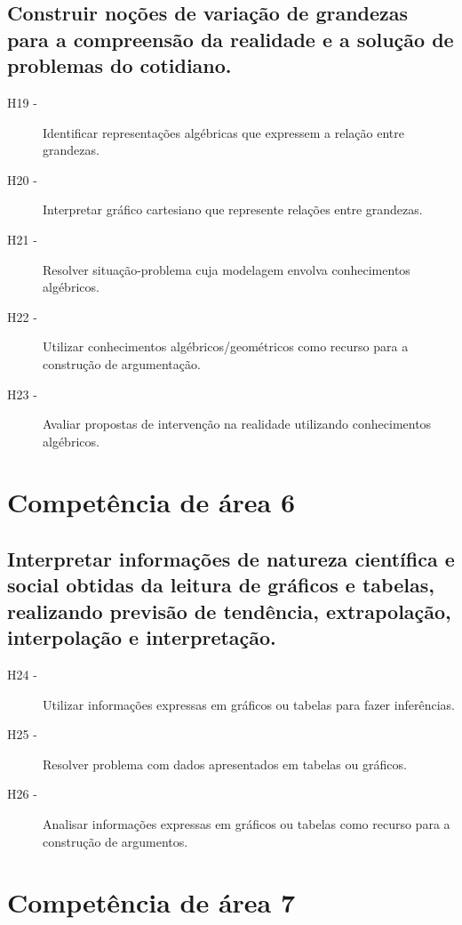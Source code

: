     \subsection*{Construir noções de variação de grandezas para a compreensão da realidade
    	e a solução de problemas do cotidiano.}
    	\begin{description}
    		\item [H19 -]Identificar representações algébricas que expressem a relação entre grandezas.
    		\item [H20 -]Interpretar gráfico cartesiano que represente relações entre grandezas.
    		\item [H21 -]Resolver situação-problema cuja modelagem envolva conhecimentos algébricos.
    		\item [H22 -]Utilizar conhecimentos algébricos/geométricos como recurso para a construção de argumentação.
    		\item [H23 -]Avaliar propostas de intervenção na realidade utilizando conhecimentos algébricos.
    	\end{description}

\section*{Competência de área 6}
    \subsection*{Interpretar informações de natureza científica e social obtidas da leitura de gráficos e tabelas,
    	realizando previsão de tendência, extrapolação, interpolação e interpretação.}
    	\begin{description}
    		\item [H24 -]Utilizar informações expressas em gráficos ou tabelas para fazer inferências.
    		\item [H25 -]Resolver problema com dados apresentados em tabelas ou gráficos.
    		\item [H26 -]Analisar informações expressas em gráficos ou tabelas como recurso para a construção de argumentos.
    	\end{description}

\section*{Competência de área 7}
